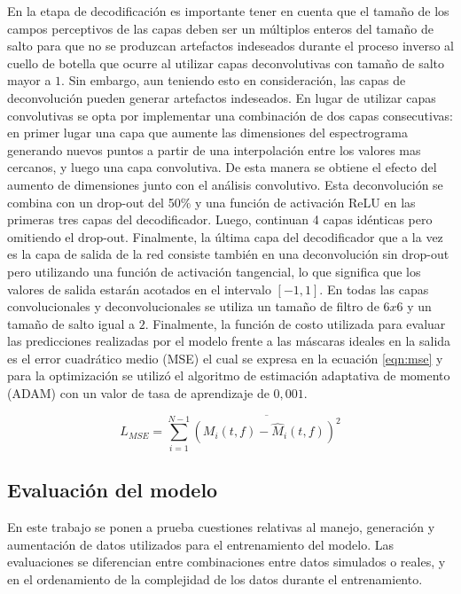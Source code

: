En la etapa de decodificación es importante tener en cuenta que el tamaño de los campos perceptivos de las capas deben ser un múltiplos enteros del tamaño de salto para que no se produzcan artefactos indeseados durante el proceso inverso al cuello de botella que ocurre al utilizar capas deconvolutivas con tamaño de salto mayor a $1$. Sin embargo, aun teniendo esto en consideración, las capas de deconvolución pueden generar artefactos indeseados. En lugar de utilizar capas convolutivas se opta por implementar una combinación de dos capas consecutivas: en primer lugar una capa que aumente las dimensiones del espectrograma generando nuevos puntos a partir de una interpolación entre los valores mas cercanos, y luego una capa convolutiva. De esta manera se obtiene el efecto del aumento de dimensiones junto con el análisis convolutivo. Esta deconvolución se combina con un drop-out del 50\% y una función de activación ReLU en las primeras tres capas del decodificador. Luego, continuan 4 capas idénticas pero omitiendo el drop-out. Finalmente, la última capa del decodificador que a la vez es la capa de salida de la red consiste también en una deconvolución sin drop-out pero utilizando una función de activación tangencial, lo que significa que los valores de salida estarán acotados en el intervalo $[-1, 1]$.
En todas las capas convolucionales y deconvolucionales se utiliza un tamaño de filtro de $6x6$ y un tamaño de salto igual a $2$. 
Finalmente, la función de costo utilizada para evaluar las predicciones realizadas por el modelo frente a las máscaras ideales en la salida es el error cuadrático medio (MSE) el cual se expresa en la ecuación \ref{eqn:mse} y para la optimización se utilizó el algoritmo de estimación adaptativa de momento (ADAM) \cite{adam} con un valor de tasa de aprendizaje de $0,001$. 

\begin{equation}
\label{eqn:mse}
	L_{MSE} = \sum_{i=1}^{N-1}\overline{(M_{i}(t,f) - \hat{M}_{i}(t,f))^{2}} 
\end{equation}

\subsection{Evaluación del modelo}
En este trabajo se ponen a prueba cuestiones relativas al manejo, generación y aumentación de datos utilizados para el entrenamiento del modelo. Las evaluaciones se diferencian entre combinaciones entre datos simulados o reales, y en el ordenamiento de la complejidad de los datos durante el entrenamiento. 

